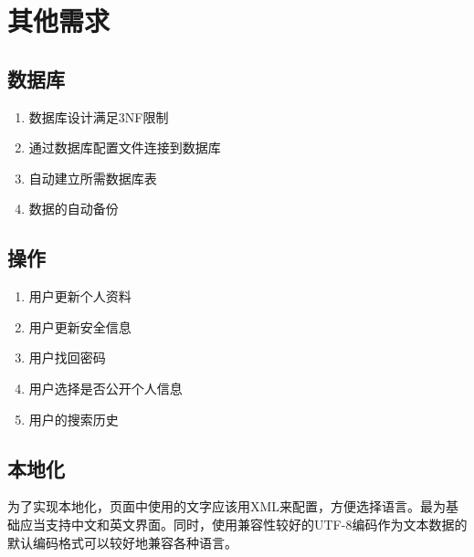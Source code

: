 \chapter{其他需求}

\section{数据库}

\begin{enumerate}
	\item 数据库设计满足3NF限制
	\item 通过数据库配置文件连接到数据库
	\item 自动建立所需数据库表
	\item 数据的自动备份
\end{enumerate}

\section{操作}

\begin{enumerate}
	\item 用户更新个人资料
	\item 用户更新安全信息
	\item 用户找回密码
	\item 用户选择是否公开个人信息
	\item 用户的搜索历史
\end{enumerate}


\section{本地化}

为了实现本地化，页面中使用的文字应该用XML来配置，方便选择语言。最为基础应当支持中文和英文界面。同时，使用兼容性较好的UTF-8编码作为文本数据的默认编码格式可以较好地兼容各种语言。
